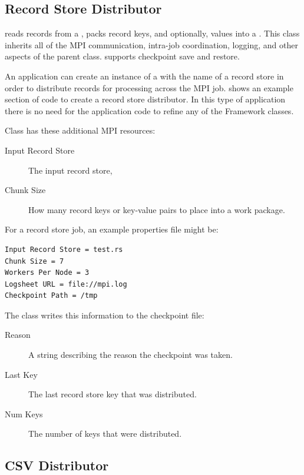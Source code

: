 \subsection{Record Store Distributor}
\label{sec-recordstoredistributor}

 reads records from a ,
packs record keys, and optionally, values into a . This
class inherits all of the MPI communication, intra-job coordination, logging,
and other aspects of the  parent class.
 supports checkpoint save and restore.

An application can create an instance of a 
with the name of a record store in order to distribute records for
processing across the MPI job.  shows an
example section of code to create a record store distributor. In this
type of application there is no need for the application code to refine
any of the Framework classes.

Class  has these additional MPI resources:
\begin{description}
\item[Input Record Store] The input record store,
\item[Chunk Size] How many record keys or key-value pairs to place into a
work package.
\end{description}

For a record store job, an example properties file might be:
\begin{verbatim}
Input Record Store = test.rs
Chunk Size = 7
Workers Per Node = 3
Logsheet URL = file://mpi.log
Checkpoint Path = /tmp
\end{verbatim}

The  class writes this information to the
checkpoint file:
\begin{description}
\item[Reason] A string describing the reason the checkpoint was taken.
\item[Last Key] The last record store key that was distributed.
\item[Num Keys] The number of keys that were distributed.
\end{description}

\subsection{CSV Distributor}
\label{sec-csvdistributor}

